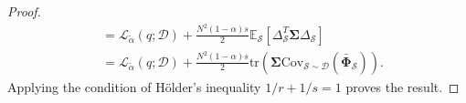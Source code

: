 \begin{proof}
\begin{equation*}
\begin{aligned}
	&= \mathcal{L}_{\tilde{\alpha}}(q; \mathcal{D}) + \frac{N^2(1-\alpha) s}{2} \mathbb{E}_{\mathcal{S}} [\Delta_{\mathcal{S}}^T \bm{\Sigma} \Delta_{\mathcal{S}} ] \\
	&= \mathcal{L}_{\tilde{\alpha}}(q; \mathcal{D}) + \frac{N^2(1-\alpha) s}{2} \mathrm{tr}(\bm{\Sigma} \mathrm{Cov}_{\mathcal{S} \sim \mathcal{D}}( \bar{\bm{\Phi}}_{\mathcal{S}})).
\end{aligned}
\end{equation*}
Applying the condition of H{\"o}lder's inequality $1/r + 1/s = 1$ proves the result.
\end{proof}
